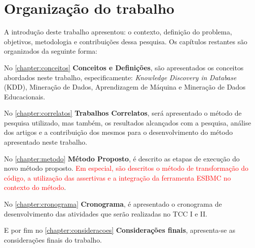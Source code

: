 

\section{Organização do trabalho}
A introdução deste trabalho apresentou: o contexto, definição do problema, objetivos, metodologia e contribuições dessa pesquisa. Os capítulos restantes são organizados da seguinte forma:

\par
No \autoref{chapter:conceitos} \textbf{Conceitos e Definições}, são apresentados os conceitos abordados neste trabalho, especificamente: \textit{Knowledge Discovery in Database} (KDD), Mineração de Dados, Aprendizagem de Máquina e Mineração de Dados Educacionais.

\par
No \autoref{chapter:correlatos} \textbf{Trabalhos Correlatos}, será apresentado o método de pesquisa utilizado, mas também, os resultados alcançados com a pesquisa, análise dos artigos e a contribuição dos mesmos para o desenvolvimento do método apresentado neste trabalho.

\par
No \autoref{chapter:metodo} \textbf{Método Proposto}, é descrito as etapas de execução do novo método proposto. \textcolor{red}{Em especial, são descritos o método de transformação do código, a utilização das assertivas e a integração da ferramenta ESBMC no contexto do método}.

\par
No \autoref{chapter:cronograma} \textbf{Cronograma}, é apresentado o cronograma de desenvolvimento das atividades que serão realizadas no TCC I e II. %
\par
E por fim no \autoref{chapter:consideracoes} \textbf{Considerações finais}, apresenta-se as considerações finais do trabalho. 
